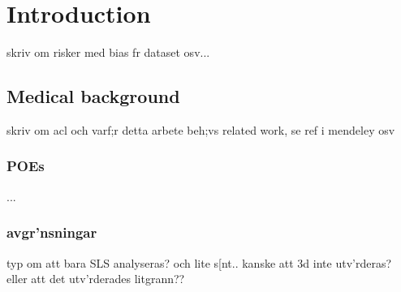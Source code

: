 \chapter{Introduction}



skriv om risker med bias fr dataset osv...

\section{Medical background}
skriv om acl och varf;r detta arbete beh;vs
related work, se ref i mendeley osv
\subsection{POEs}
...

\subsection{avgr'nsningar}
typ om att bara SLS analyseras? och lite s[nt.. kanske att 3d inte utv'rderas? eller att det utv'rderades litgrann??
